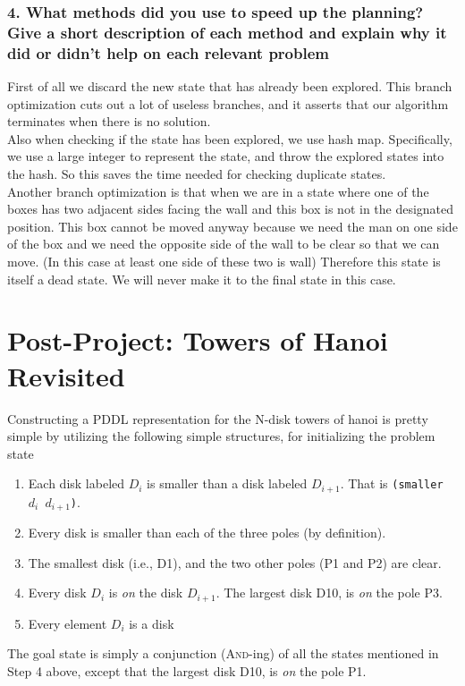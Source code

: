\documentclass[10pt, letter]{article}
\begin{document}
\subsubsection*{4. What methods did you use to speed up the planning? Give a short description of each method
and explain why it did or didn't help on each relevant problem}
First of all we discard the new state that has already been explored.
This branch optimization cuts out a lot of useless branches, and it asserts that our algorithm terminates when there is no solution.
\\Also when checking if the state has been explored, we use hash map. 
Specifically, we use a large integer to represent the state, and throw the explored states into the hash.
So this saves the time needed for checking duplicate states.
\\Another branch optimization is that when we are in a state where one of the boxes has two adjacent sides facing the wall and this box is not in the designated position.
This box cannot be moved anyway because we need the man on one side of the box and we need the opposite side of the wall to be clear so that we can move. (In this case at least one side of these two is wall)
Therefore this state is itself a dead state. 
We will never make it to the final state in this case.


\section{Post-Project: Towers of Hanoi Revisited}
Constructing a PDDL representation for the N-disk towers of hanoi is pretty simple by utilizing the following simple structures, for initializing the problem state
\begin{enumerate}
\item Each disk labeled $D_i$ is smaller than a disk labeled $D_{i+1}$. That is \texttt{(smaller $d_i$ $d_{i+1}$)}.
\item Every disk is smaller than each of the three poles (by definition).
\item The smallest disk (i.e., D1), and the two other poles (P1 and P2) are clear.
\item Every disk $D_i$ is \emph{on} the disk $D_{i+1}$. The largest disk D10, is \emph{on} the pole P3.
\item Every element $D_i$ is a disk
\end{enumerate}
The goal state is simply a conjunction (\textsc{And}-ing) of all the states mentioned in Step 4 above, except that the largest disk D10, is \emph{on} the pole P1.
\end{document}
